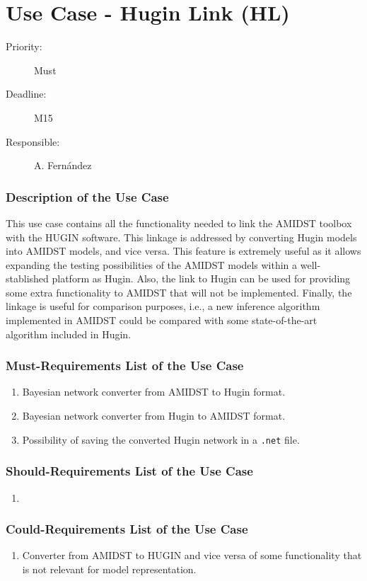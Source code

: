 \newpage
\section{Use Case - Hugin Link (HL)}
\label{UseCase:HL}

\begin{description}
\item[Priority:] Must
\item[Deadline:] M15
\item[Responsible:] A. Fern\'andez
\end{description}

\subsubsection*{Description of the Use Case}

This use case contains all the functionality needed to link the AMIDST toolbox with the HUGIN software. This linkage is addressed by converting Hugin models into AMIDST models, and vice versa. This feature is extremely useful as it allows expanding the testing possibilities of the AMIDST models within a well-stablished platform as Hugin. Also, the link to Hugin can be used for providing some extra functionality to AMIDST that will not be implemented. Finally, the linkage is useful for comparison purposes, i.e., a new inference algorithm implemented in AMIDST could be compared with some state-of-the-art algorithm included in Hugin.

\subsubsection*{Must-Requirements List of the Use Case}

\begin{enumerate}
\item Bayesian network converter from AMIDST to Hugin format. 
\item Bayesian network converter from Hugin to AMIDST format.
\item Possibility of saving the converted Hugin network in a \texttt{.net} file.
\end{enumerate}

\subsubsection*{Should-Requirements List of the Use Case}

\begin{enumerate}
\item 
\end{enumerate}

\subsubsection*{Could-Requirements List of the Use Case}

\begin{enumerate}
\item Converter from AMIDST to HUGIN  and vice versa of some functionality that is not relevant for model representation.
\end{enumerate}

